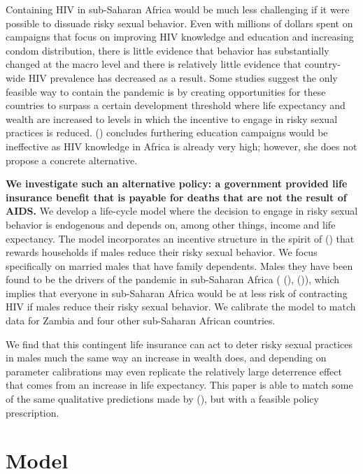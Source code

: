 \documentclass[12pt]{article}
\newcommand{\citee}[1]{\citename{#1} (\citeyear{#1})}
\begin{document}
Containing HIV in sub-Saharan Africa would be much less challenging if it were possible to dissuade risky sexual behavior. Even with millions of dollars spent on campaigns that focus on improving HIV knowledge and education and increasing condom distribution, there is little evidence that behavior has substantially changed at the macro level and there is relatively little evidence that country-wide HIV prevalence has decreased as a result.  Some studies suggest the only feasible way to contain the pandemic is by creating opportunities for these countries to surpass a certain development threshold where life expectancy and wealth are increased to levels in which the incentive to engage in risky sexual practices is reduced.  \citee{eo2009} concludes furthering education campaigns would be ineffective as HIV knowledge in Africa is already very high; however, she does not propose a concrete alternative.

\textbf{We investigate such an alternative policy: a government provided life insurance benefit that is payable for deaths that are not the result of AIDS.}  We develop a life-cycle model where the decision to engage in risky sexual behavior is endogenous and depends on, among other things, income and life expectancy.  The model incorporates an incentive structure in the spirit of \citee{HO2010} that rewards households if males reduce their risky sexual behavior.  We focus specifically on married males that have family dependents.  Males they have been found to be the drivers of the pandemic in sub-Saharan Africa (\citee{Ulin1992}, \citee{HE2007}), which implies that everyone in sub-Saharan Africa would be at less risk of contracting HIV if males reduce their risky sexual behavior.  We calibrate the model to match data for Zambia and four other sub-Saharan African countries.

We find that this contingent life insurance can act to deter risky sexual practices in males much the same way an increase in wealth does, and depending on parameter calibrations may even replicate the relatively large deterrence effect that comes from an increase in life expectancy.  This paper is able to match some of the same qualitative predictions made by \citee{eoQJE}, but with a feasible policy prescription.

\section{Model}\label{s:model}
\end{document}

